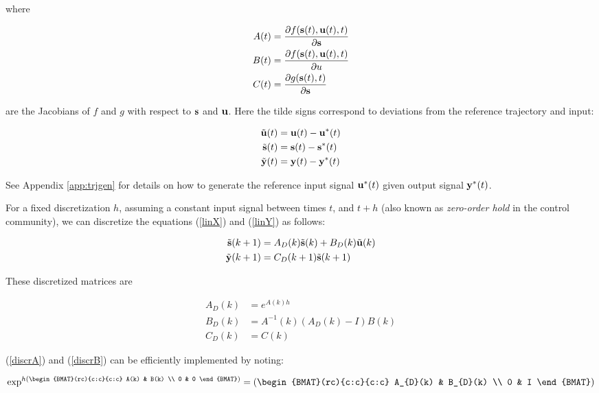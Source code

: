 where 

\begin{align}
A(t) &= \frac{\partial{f(\mathbf{s}(t), \mathbf{u}(t), t)}}{\partial{\mathbf{s}}} \\
B(t) &= \frac{\partial{f(\mathbf{s}(t), \mathbf{u}(t), t)}}{\partial{u}} \\
C(t) &= \frac{\partial{g(\mathbf{s}(t), t)}}{\partial{\mathbf{s}}}
\end{align}

are the Jacobians of $f$ and $g$ with respect to $\mathbf{s}$ and $\mathbf{u}$. Here the tilde signs correspond to deviations from the reference trajectory and input:

\begin{align}
\tilde{\mathbf{u}}(t) &= \mathbf{u}(t) - \mathbf{u}^{*}(t) \\
\tilde{\mathbf{s}}(t) &= \mathbf{s}(t) - \mathbf{s}^{*}(t) \\
\tilde{\mathbf{y}}(t) &= \mathbf{y}(t) - \mathbf{y}^{*}(t)
\end{align}

See Appendix \ref{app:trjgen} for details on how to generate the reference input signal $\mathbf{u}^{*}(t)$ given output signal $\mathbf{y}^{*}(t)$.

For a fixed discretization $h$, assuming a constant input signal between times $t$, and $t+h$ (also known as \emph{zero-order hold} in the control community), we can discretize the equations (\ref{linX}) and (\ref{linY}) as follows:

\begin{align}
\tilde{\mathbf{s}}(k+1) &= A_{D}(k)\tilde{\mathbf{s}}(k) + B_{D}(k)\tilde{\mathbf{u}}(k) \label{discX} \\
\tilde{\mathbf{y}}(k+1) &= C_{D}(k+1)\tilde{\mathbf{s}}(k+1) \label{discY}
\end{align}

These discretized matrices are 

\begin{align}
A_{D}(k) &= e^{A(k)h} \label{discrA} \\
B_{D}(k) &= A^{-1}(k)(A_{D}(k) - I)B(k) \label{discrB} \\
C_{D}(k) &= C(k)
\end{align}

(\ref{discrA}) and (\ref{discrB}) can be efficiently implemented by noting:

\begin{equation*}
\exp^{h \left(
\begin{BMAT}(rc){c:c}{c:c}
A(k) & B(k) \\
0 & 0
\end{BMAT} 
\right)}
= 
\left(
\begin{BMAT}(rc){c:c}{c:c}
A_{D}(k) & B_{D}(k) \\
0 & I
\end{BMAT} 
\right)
\end{equation*}

